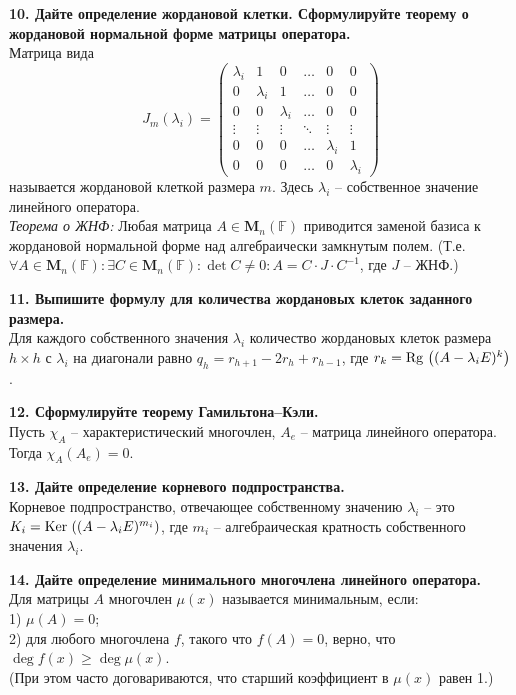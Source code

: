 \documentclass[11pt,a4paper]{article}
\newcommand{\F}{\mathbb{F}}
\newcommand{\Rg}[1]{\mathrm{Rg}\hspace{0.5mm}#1}
\newcommand{\Ker}[1]{\mathrm{Ker}\hspace{0.5mm}#1}
\begin{document}
\textbf{10. Дайте определение жордановой клетки. Сформулируйте теорему о жордановой нормальной форме матрицы оператора.\\}
Матрица вида
$$J_m( \lambda_i ) = \left( \begin{matrix}
\lambda_i & 1 & 0 & \hdots & 0 & 0 \\
0 & \lambda_i & 1 & \hdots & 0 & 0 \\
0 & 0 & \lambda_i & \hdots & 0 & 0 \\
\vdots & \vdots & \vdots & \ddots & \vdots & \vdots \\
0 & 0 & 0 & \hdots & \lambda_i & 1 \\
0 & 0 & 0 & \hdots & 0 & \lambda_i
\end{matrix} \right)$$
называется жордановой клеткой размера $m$. Здесь $\lambda_i$ -- собственное значение линейного оператора.\\
\textit{Теорема о ЖНФ:} Любая матрица $A \in \mathbf{M}_n( \F )$ приводится заменой базиса к жордановой нормальной форме над алгебраически замкнутым полем. (Т.е. $\forall A \in \mathbf{M}_n( \F ): \exists C \in \mathbf{M}_n( \F ) : \det C \neq 0 : A = C \cdot J \cdot C^{-1}$, где $J$ -- ЖНФ.)

\textbf{11. Выпишите формулу для количества жордановых клеток заданного размера.\\}
Для каждого собственного значения $\lambda_i$ количество жордановых клеток размера $h \times h$ с $\lambda_i$ на диагонали равно $q_h = r_{h+1} - 2 r_h + r_{h-1}$, где $r_k = \Rg{\left((A - \lambda_i E)^k\right)}$.

\textbf{12. Сформулируйте теорему Гамильтона--Кэли.\\}
Пусть $\chi_A$ -- характеристический многочлен, $A_e$ -- матрица линейного оператора. Тогда $\chi_A ( A_e ) = 0$.

\textbf{13. Дайте определение корневого подпространства.\\}
Корневое подпространство, отвечающее собственному значению $\lambda_i$ -- это $K_i = \Ker{\left((A - \lambda_i E)^{m_i}\right)}$, где $m_i$ -- алгебраическая кратность собственного значения $\lambda_i$.

\textbf{14. Дайте определение минимального многочлена линейного оператора.\\}
Для матрицы $A$ многочлен $\mu(x)$ называется минимальным, если:\\
1) $\mu(A) = 0$;\\
2) для любого многочлена $f$, такого что $f(A) = 0$, верно, что $\deg f(x) \geq \deg \mu(x)$.\\
(При этом часто договариваются, что старший коэффициент в $\mu (x)$ равен 1.)
\end{document}
